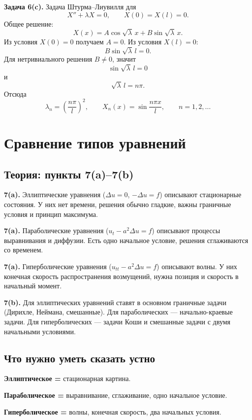 \documentclass[a4paper,12pt]{article}
\begin{document}
\textbf{Задача 6(c).} Задача Штурма--Лиувилля для
\[
X''+\lambda X=0,
\qquad
X(0)=X(l)=0.
\]
Общее решение:
\[
X(x)=A\cos\sqrt\lambda\,x+B\sin\sqrt\lambda\,x.
\]
Из условия $X(0)=0$ получаем $A=0$. Из условия $X(l)=0$:
\[
B\sin\sqrt\lambda\,l=0.
\]
Для нетривиального решения $B\ne 0$, значит
\[
\sin\sqrt\lambda\,l=0
\]
и
\[
\sqrt\lambda\,l=n\pi.
\]
Отсюда
\[
\lambda_n=\left(\frac{n\pi}{l}\right)^2,
\qquad
X_n(x)=\sin\frac{n\pi x}{l},
\qquad n=1,2,\dots
\]

\section{Сравнение типов уравнений}

\subsection{Теория: пункты 7(a)--7(b)}

\textbf{7(a).} Эллиптические уравнения ($\Delta u=0$, $-\Delta u=f$) описывают стационарные состояния. У них нет времени, решения обычно гладкие, важны граничные условия и принцип максимума.

\textbf{7(a).} Параболические уравнения ($u_t-a^2\Delta u=f$) описывают процессы выравнивания и диффузии. Есть одно начальное условие, решения сглаживаются со временем.

\textbf{7(a).} Гиперболические уравнения ($u_{tt}-a^2\Delta u=f$) описывают волны. У них конечная скорость распространения возмущений, нужна позиция и скорость в начальный момент.

\textbf{7(b).} Для эллиптических уравнений ставят в основном граничные задачи (Дирихле, Неймана, смешанные). Для параболических --- начально-краевые задачи. Для гиперболических --- задачи Коши и смешанные задачи с двумя начальными условиями.

\subsection{Что нужно уметь сказать устно}

\textbf{Эллиптическое =} стационарная картина.

\textbf{Параболическое =} выравнивание, сглаживание, одно начальное условие.

\textbf{Гиперболическое =} волны, конечная скорость, два начальных условия.
\end{document}
